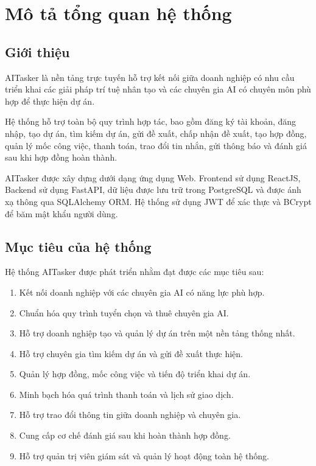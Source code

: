 \chapter{Mô tả tổng quan hệ thống}

\section{Giới thiệu}

AITasker là nền tảng trực tuyến hỗ trợ kết nối giữa doanh nghiệp có nhu cầu
triển khai các giải pháp trí tuệ nhân tạo và các chuyên gia AI có chuyên môn
phù hợp để thực hiện dự án.

Hệ thống hỗ trợ toàn bộ quy trình hợp tác, bao gồm đăng ký tài khoản, đăng nhập,
tạo dự án, tìm kiếm dự án, gửi đề xuất, chấp nhận đề xuất, tạo hợp đồng,
quản lý mốc công việc, thanh toán, trao đổi tin nhắn, gửi thông báo và đánh giá
sau khi hợp đồng hoàn thành.

AITasker được xây dựng dưới dạng ứng dụng Web. Frontend sử dụng ReactJS,
Backend sử dụng FastAPI, dữ liệu được lưu trữ trong PostgreSQL và được ánh xạ
thông qua SQLAlchemy ORM. Hệ thống sử dụng JWT để xác thực và BCrypt để băm
mật khẩu người dùng.


\section{Mục tiêu của hệ thống}

Hệ thống AITasker được phát triển nhằm đạt được các mục tiêu sau:

\begin{enumerate}
    \item Kết nối doanh nghiệp với các chuyên gia AI có năng lực phù hợp.
    \item Chuẩn hóa quy trình tuyển chọn và thuê chuyên gia AI.
    \item Hỗ trợ doanh nghiệp tạo và quản lý dự án trên một nền tảng thống nhất.
    \item Hỗ trợ chuyên gia tìm kiếm dự án và gửi đề xuất thực hiện.
    \item Quản lý hợp đồng, mốc công việc và tiến độ triển khai dự án.
    \item Minh bạch hóa quá trình thanh toán và lịch sử giao dịch.
    \item Hỗ trợ trao đổi thông tin giữa doanh nghiệp và chuyên gia.
    \item Cung cấp cơ chế đánh giá sau khi hoàn thành hợp đồng.
    \item Hỗ trợ quản trị viên giám sát và quản lý hoạt động toàn hệ thống.
\end{enumerate}

